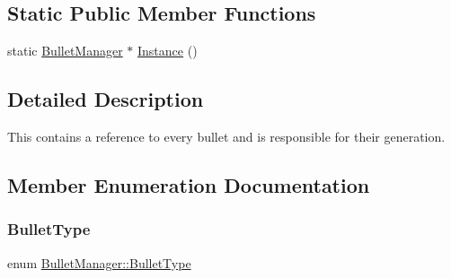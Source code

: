 \subsection*{Static Public Member Functions}
\begin{DoxyCompactItemize}
\item 
static \hyperlink{class_bullet_manager}{Bullet\+Manager} $\ast$ \hyperlink{class_bullet_manager_a03afa820ec61a56990097d6beb97d738}{Instance} ()
\end{DoxyCompactItemize}


\subsection{Detailed Description}
This contains a reference to every bullet and is responsible for their generation. 



\subsection{Member Enumeration Documentation}
\mbox{\label{class_bullet_manager_af49df9c4e5e7d87c13f2660851090580}} 
\subsubsection{\texorpdfstring{Bullet\+Type}{BulletType}}
{\footnotesize\ttfamily enum \hyperlink{class_bullet_manager_af49df9c4e5e7d87c13f2660851090580}{Bullet\+Manager\+::\+Bullet\+Type}}

